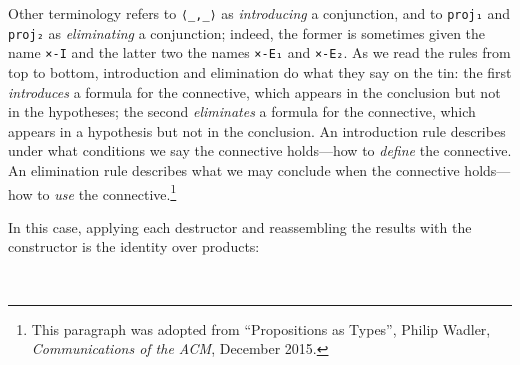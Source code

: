 Other terminology refers to \texttt{⟨\_,\_⟩} as \emph{introducing} a
conjunction, and to \texttt{proj₁} and \texttt{proj₂} as
\emph{eliminating} a conjunction; indeed, the former is sometimes given
the name \texttt{×-I} and the latter two the names \texttt{×-E₁} and
\texttt{×-E₂}. As we read the rules from top to bottom, introduction and
elimination do what they say on the tin: the first \emph{introduces} a
formula for the connective, which appears in the conclusion but not in
the hypotheses; the second \emph{eliminates} a formula for the
connective, which appears in a hypothesis but not in the conclusion. An
introduction rule describes under what conditions we say the connective
holds---how to \emph{define} the connective. An elimination rule
describes what we may conclude when the connective holds---how to
\emph{use} the connective.\footnote{This paragraph was adopted from
  ``Propositions as Types'', Philip Wadler, \emph{Communications of the
  ACM}, December 2015.}

In this case, applying each destructor and reassembling the results with
the constructor is the identity over products:

\begin{fence}
\begin{code}%
\>[0]\AgdaSpace{}%
\AgdaSymbol{:}\AgdaSpace{}%
\AgdaSpace{}%
\AgdaSymbol{\{}\AgdaSpace{}%
\AgdaSpace{}%
\AgdaSymbol{:}\AgdaSpace{}%
\AgdaSymbol{\}}\AgdaSpace{}%
\AgdaSymbol{(}\AgdaSpace{}%
\AgdaSymbol{:}\AgdaSpace{}%
\AgdaSpace{}%
\AgdaSpace{}%
\AgdaSymbol{)}\AgdaSpace{}%
\AgdaSpace{}%
\AgdaSpace{}%
\AgdaSpace{}%
\AgdaSpace{}%
\AgdaOperator{\AgdaInductiveConstructor{,}}\AgdaSpace{}%
\AgdaSpace{}%
\AgdaSpace{}%
\AgdaSpace{}%
\AgdaSpace{}%
\<%
\\
\>[0]\AgdaSpace{}%
\AgdaSpace{}%
\AgdaSpace{}%
\AgdaOperator{\AgdaInductiveConstructor{,}}\AgdaSpace{}%
\AgdaSpace{}%
\AgdaSpace{}%
\AgdaSymbol{=}\AgdaSpace{}%
\<%
\end{code}
\end{fence}

